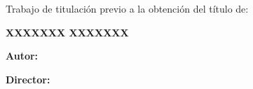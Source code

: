 \begin{titlepage}
  {\fontsize{12}{14.4}\selectfont Trabajo de titulación previo a la obtención del título de:\par}
  \vspace{1cm}

  {\fontsize{18}{21.6}\bfseries\MakeUppercase{XXXXXXX XXXXXXX}\par}

  \vspace{1cm}

  \raggedright
  {\fontsize{12}{24}\selectfont\bfseries Autor:}
  {\fontsize{12}{24}\selectfont \UTPLauthor}\par

  {\fontsize{12}{24}\selectfont\bfseries Director:}
  {\fontsize{12}{24}\selectfont \UTPLadvisor}\par


  \centering

  \vfill

  {\fontsize{12}{14.4}\MakeUppercase{\UTPLcity}\par}
  {\fontsize{12}{14.4}\UTPLyear\par}
\end{titlepage}